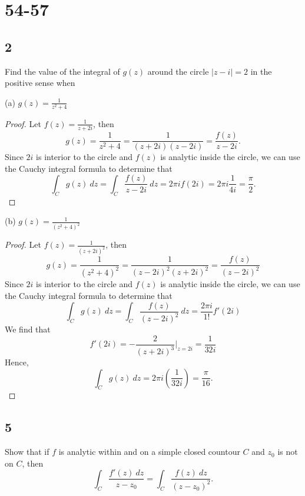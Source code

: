 \documentclass{article}
\begin{document}
\section*{54-57}
\subsection*{2}
Find the value of the integral of $g(z)$ around the circle $|z-i|=2$ in the
positive sense when

(a) $g(z) = \frac{1}{z^2 + 4}$
\begin{proof}
    Let $f(z) = \frac{1}{z+2i}$, then
    \begin{equation*}
        g(z) = \frac{1}{z^2 + 4} = \frac{1}{(z + 2i)(z - 2i)} =
        \frac{f(z)}{z - 2i}.
    \end{equation*}
    Since $2i$ is interior to the circle and $f(z)$ is analytic inside the circle,
    we can use the Cauchy integral formula to determine that
    \begin{equation*}
        \int_C g(z) \ dz = \int_C \frac{f(z)}{z - 2i} \ dz =
        2\pi i f(2i) = 2\pi i \frac{1}{4i} = \frac{\pi}{2}.
    \end{equation*}
\end{proof}

(b) $g(z) = \frac{1}{(z^2 + 4)^2}$
\begin{proof}
    Let $f(z) = \frac{1}{(z + 2i)^2}$, then
    \begin{equation*}
        g(z) = \frac{1}{(z^2 + 4)^2} = \frac{1}{(z - 2i)^2(z + 2i)^2} =
        \frac{f(z)}{(z - 2i)^2}
    \end{equation*}
    Since $2i$ is interior to the circle and $f(z)$ is analytic inside the circle,
    we can use the Cauchy integral formula to determine that
    \begin{equation*}
        \int_C g(z) \ dz  = \int_C \frac{f(z)}{(z - 2i)^2} \ dz
        = \frac{2\pi i}{1!} f'(2i)
    \end{equation*}
    We find that
    \begin{equation*}
        f'(2i) = -\frac{2}{(z + 2i)^3} \big |_{z = 2i} = \frac{1}{32i}
    \end{equation*}
    Hence,
    \begin{equation*}
        \int_C g(z) \ dz  = 2\pi i (\frac{1}{32i}) = \frac{\pi}{16}.
    \end{equation*}
\end{proof}

\subsection*{5}
Show that if $f$ is analytic within and on a simple closed countour $C$ and
$z_0$ is not on $C$, then
\begin{equation*}
    \int_C \frac{f'(z) \ dz}{z - z_0} = \int_C \frac{f(z) \ dz}{(z - z_0)^2}.
\end{equation*}
\end{document}
